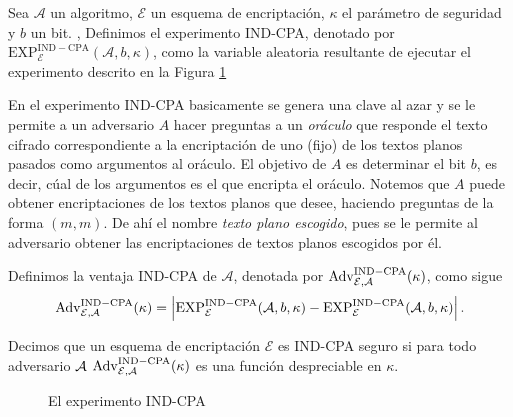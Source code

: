 \begin{definicion}
Sea $\mathcal{A}$ un algoritmo, $\mathcal{E}$ un esquema de encriptación, $\kappa$ el parámetro de
seguridad y $b$ un bit. ,
Definimos el experimento IND-CPA, denotado por $\mathrm{EXP}^\mathrm{IND-CPA}_\mathcal{E}(\mathcal{A}, b, \kappa)$,
como la variable aleatoria resultante de
ejecutar el experimento descrito en la Figura \ref{fig:ind_cpa}
\end{definicion}

En el experimento IND-CPA basicamente se genera una clave al azar y se le permite a un adversario $A$
hacer preguntas a un \textit{oráculo} que responde el texto cifrado correspondiente a la encriptación de uno
(fijo) de los textos planos pasados como argumentos al oráculo. El objetivo de $A$ es determinar el bit $b$,
es decir, cúal de los argumentos es el que encripta el oráculo. Notemos que $A$ puede obtener encriptaciones
de los textos planos que desee, haciendo preguntas de la forma $(m,m)$. De ahí el nombre \textit{texto plano
escogido}, pues se le permite al adversario obtener las encriptaciones de textos planos escogidos por él.

\begin{definicion}
Definimos la ventaja IND-CPA de $\mathcal{A}$, denotada por $\mathrm{Adv}^\mathrm{IND-CPA}_{\mathcal{E},\mathcal{A}}(\kappa)$,
como sigue
$$
\mathrm{Adv}^\mathrm{IND-CPA}_{\mathcal{E},\mathcal{A}}(\kappa) =
\left| 
    \mathrm{EXP}^\mathrm{IND-CPA}_\mathcal{E}(\mathcal{A}, b, \kappa)
    -
    \mathrm{EXP}^\mathrm{IND-CPA}_\mathcal{E}(\mathcal{A}, b, \kappa)
 \right|.
$$
\end{definicion}

\begin{definicion}
Decimos que un esquema de encriptación $\mathcal{E}$ es IND-CPA seguro si
para todo adversario $\mathcal{A}$ $\mathrm{Adv}^\mathrm{IND-CPA}_{\mathcal{E},\mathcal{A}}(\kappa)$ es una función
despreciable en $\kappa$.
\end{definicion}

\begin{figure}
\begin{centering}
\end{centering}
\caption{El experimento IND-CPA}
\label{fig:ind_cpa}
\end{figure}


